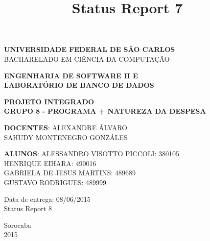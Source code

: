 \documentclass[a4paper,12pt]{article}
\title{Status Report 7}
\begin{document}
\renewcommand*\sectionmark[1]{\markboth{#1}{}}
\renewcommand*\subsectionmark[1]{\markboth{#1}{}}


\begin{titlepage}
\begin{center}
{\bf \large UNIVERSIDADE FEDERAL DE SÃO CARLOS}\\[0.2cm]
{\large BACHARELADO EM CIÊNCIA DA COMPUTAÇÃO}\\[0.2cm]

\end{center}

\vfill
\begin{center}
{\bf \large ENGENHARIA DE SOFTWARE II E\\LABORATÓRIO DE BANCO DE DADOS}\\[3.2cm]
\end{center}

\begin{center}
{\bf \LARGE PROJETO INTEGRADO}\\[0.3cm]
{\bf \Large GRUPO 8 - PROGRAMA + NATUREZA DA DESPESA}\\[2.2cm]
\end{center}

\vfill
\begin{flushright}
{\large \textbf{DOCENTES}: ALEXANDRE ÁLVARO}\\[0.2cm]
{\large SAHUDY MONTENEGRO GONZÁLES}\\[0.5cm]
\end{flushright}

\vfill
\begin{flushright}
{\large {\bf ALUNOS}: ALESSANDRO VISOTTO PICCOLI: 380105}\\[0.15cm]
{\large HENRIQUE EIHARA: 490016}\\[0.15cm]
{\large GABRIELA DE JESUS MARTINS: 489689}\\[0.15cm]
{\large GUSTAVO RODRIGUES: 489999}\\[0.15cm]
\end{flushright}

\vfill
\begin{flushright}
{\large Data de entrega: 08/06/2015}\\[0.2cm]
{\large Status Report 8}\\[2.0cm]
\end{flushright}

\begin{center}
{\large Sorocaba}\\[0.2cm]
{\large 2015}
\end{center}

\end{titlepage}
\end{document}
